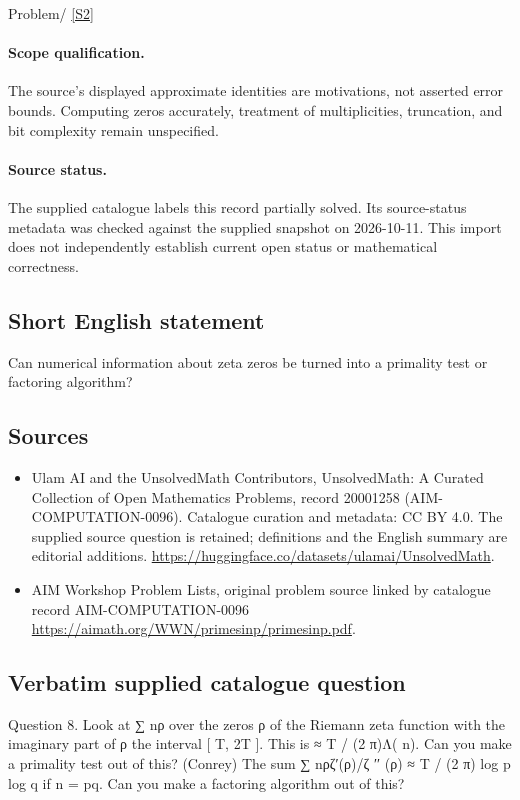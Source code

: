 \documentclass[11pt]{article}
\begin{document}
Problem/ \href{https://aimath.org/WWN/primesinp/primesinp.pdf}{[S2]}
\paragraph{Scope qualification.}
The source's displayed approximate identities are motivations, not asserted error bounds. Computing zeros accurately, treatment of multiplicities, truncation, and bit complexity remain unspecified.
\paragraph{Source status.}
The supplied catalogue labels this record partially solved. Its source-status metadata was checked against the supplied snapshot on 2026-10-11. This import does not independently establish current open status or mathematical correctness.
\subsection{Short English statement}
Can numerical information about zeta zeros be turned into a primality test or factoring algorithm?
\subsection{Sources}
\begin{itemize}
\item[S1] Ulam AI and the UnsolvedMath Contributors, UnsolvedMath: A Curated Collection of Open Mathematics Problems, record 20001258 (AIM-COMPUTATION-0096). Catalogue curation and metadata: CC BY 4.0. The supplied source question is retained; definitions and the English summary are editorial additions.
\url{https://huggingface.co/datasets/ulamai/UnsolvedMath}.
\item[S2] AIM Workshop Problem Lists, original problem source linked by catalogue record AIM-COMPUTATION-0096
\url{https://aimath.org/WWN/primesinp/primesinp.pdf}.
\end{itemize}
\subsection{Verbatim supplied catalogue question}
Question 8. Look at ∑ nρ over the zeros ρ of the Riemann zeta function with the imaginary part of ρ the interval [ T, 2T ]. This is ≈ T / (2 π)Λ( n). Can you make a primality test out of this? (Conrey) The sum ∑ nρζ′(ρ)/ζ ′′ (ρ) ≈ T / (2 π) log p log q if n = pq. Can you make a factoring algorithm out of this?
\end{document}
